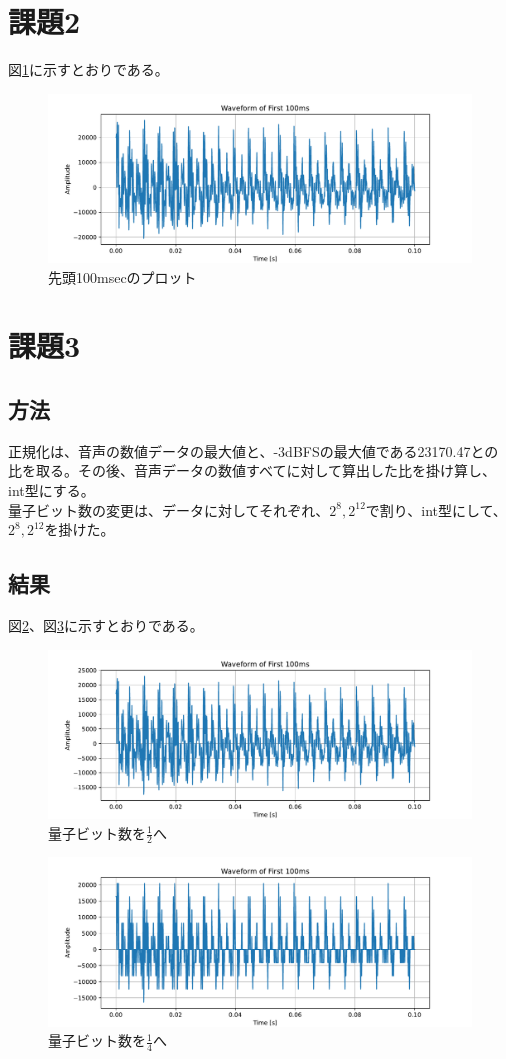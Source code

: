 \documentclass[a4j,11pt]{jarticle}
\begin{document}
    \section{課題2}
    図\ref{fig:2}に示すとおりである。
    \begin{figure}[tb]
        \centering
        \includegraphics[width=0.8\hsize]{../../figure/dataplot_arayurugennzituwo.pdf}
        \caption{先頭100msecのプロット}
        \label{fig:2}
    \end{figure}
    \section{課題3}
    \subsection{方法}
    正規化は、音声の数値データの最大値と、-3dBFSの最大値である23170.47との比を取る。その後、音声データの数値すべてに対して算出した比を掛け算し、int型にする。\\
    量子ビット数の変更は、データに対してそれぞれ、$2^{8},2^{12}$で割り、int型にして、$2^{8},2^{12}$を掛けた。
    \subsection{結果}
    図\ref{fig:3-1}、図\ref{fig:3-2}に示すとおりである。
    \begin{figure}[tb]
        \centering
        \includegraphics[width=0.8\hsize]{../../figure/dataplot_8bit_arayurugennzituwo.pdf}
        \caption{量子ビット数を$\frac 1 2$へ}
        \label{fig:3-1}
    \end{figure}
    \begin{figure}[tb]
        \centering
        \includegraphics[width=0.8\hsize]{../../figure/dataplot_4bit_arayurugennzituwo.pdf}
        \caption{量子ビット数を$\frac 1 4$へ}
        \label{fig:3-2}
    \end{figure}
\end{document}
